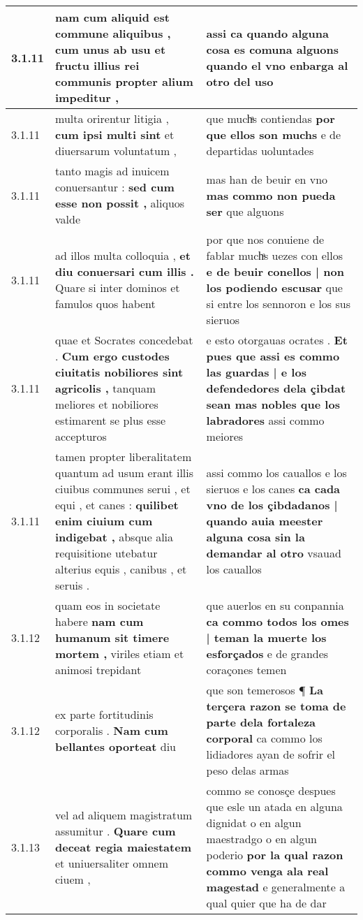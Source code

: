 \begin{tabular}{|p{1cm}|p{6.5cm}|p{6.5cm}|}
3.1.11 & nam cum aliquid est commune aliquibus , \textbf{ cum unus ab usu et fructu illius rei communis } propter alium impeditur , & assi ca quando alguna cosa es comuna \textbf{ alguons } quando el vno enbarga al otro del uso \\\hline
3.1.11 & multa orirentur litigia , \textbf{ cum ipsi multi sint } et diuersarum voluntatum , & que muchͣs contiendas \textbf{ por que ellos son muchs } e de departidas uoluntades \\\hline
3.1.11 & tanto magis ad inuicem conuersantur : \textbf{ sed cum esse non possit , } aliquos valde & mas han de beuir en vno \textbf{ mas commo non pueda ser } que alguons \\\hline
3.1.11 & ad illos multa colloquia , \textbf{ et diu conuersari cum illis . } Quare si inter dominos et famulos quos habent & por que nos conuiene de fablar muchͣs uezes con ellos \textbf{ e de beuir conellos | non los podiendo escusar } que si entre los sennoron e los sus sieruos \\\hline
3.1.11 & quae et Socrates concedebat . \textbf{ Cum ergo custodes ciuitatis nobiliores sint agricolis , } tanquam meliores et nobiliores estimarent se plus esse accepturos & e esto otorgauas ocrates . \textbf{ Et pues que assi es commo las guardas | e los defendedores dela çibdat sean mas nobles que los labradores } assi commo meiores \\\hline
3.1.11 & tamen propter liberalitatem quantum ad usum erant illis ciuibus communes serui , et equi , et canes : \textbf{ quilibet enim ciuium cum indigebat , } absque alia requisitione utebatur alterius equis , canibus , et seruis . & assi commo los cauallos e los sieruos e los canes \textbf{ ca cada vno de los çibdadanos | quando auia meester alguna cosa sin la demandar al otro } vsauad los cauallos \\\hline
3.1.12 & quam eos in societate habere \textbf{ nam cum humanum sit timere mortem , } viriles etiam et animosi trepidant & que auerlos en su conpannia \textbf{ ca commo todos los omes | teman la muerte los esforçados } e de grandes coraçones temen \\\hline
3.1.12 & ex parte fortitudinis corporalis . \textbf{ Nam cum bellantes oporteat } diu & que son temerosos ¶ \textbf{ La terçera razon se toma de parte dela fortaleza corporal } ca commo los lidiadores ayan de sofrir el peso delas armas \\\hline
3.1.13 & vel ad aliquem magistratum assumitur . \textbf{ Quare cum deceat regia maiestatem } et uniuersaliter omnem ciuem , & commo se conosçe despues que esle un atada en alguna dignidat o en algun maestradgo o en algun poderio \textbf{ por la qual razon commo venga ala real magestad } e generalmente a qual quier que ha de dar \\\hline

\end{tabular}

